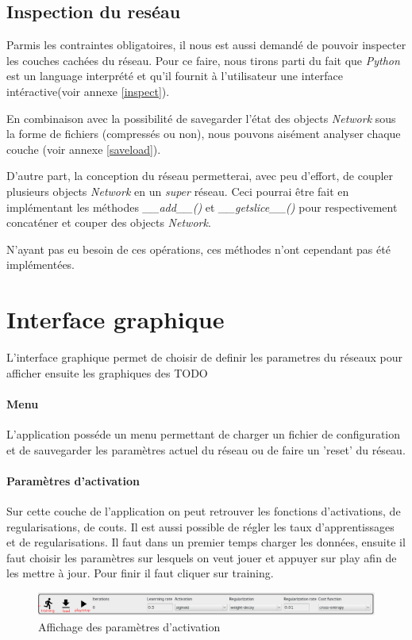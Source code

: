 \documentclass[11pt]{article}
\begin{document}
\subsection{Inspection du res\'eau}
Parmis les contraintes obligatoires, il nous est aussi demand\'e de pouvoir
inspecter les couches cach\'ees du r\'eseau. Pour ce faire, nous tirons parti du
fait que {\em Python} est un language interpr\'et\'e et qu'il fournit \`a
l'utilisateur une interface int\'eractive(voir annexe \ref{inspect}).

En combinaison avec la possibilit\'e de savegarder l'\'etat des
objects {\em Network} sous la forme de fichiers (compress\'es ou non), nous
pouvons ais\'ement analyser chaque couche (voir annexe \ref{saveload}).

D'autre part, la conception du r\'eseau permetterai, avec peu d'effort, de coupler
plusieurs objects {\em Network} en un {\em super} r\'eseau.
Ceci pourrai \^etre fait en impl\'ementant les m\'ethodes {\em \_\_add\_\_()}
et {\em \_\_getslice\_\_()} pour respectivement concat\'ener et couper des objects
{\em Network}.

N'ayant pas eu besoin de ces op\'erations, ces m\'ethodes n'ont
cependant pas \'et\'e impl\'ement\'ees.

\newpage
\section{Interface graphique}
{\color{red}
L'interface graphique permet de choisir de definir les parametres du r\'eseaux
pour afficher ensuite les graphiques des TODO}
\paragraph{Menu} L'application poss\'ede un menu permettant de charger un
fichier de configuration et de sauvegarder les param\`etres actuel du r\'eseau
ou de faire un 'reset' du r\'eseau.

\paragraph{Param\`etres d'activation} Sur cette couche de l'application on
peut retrouver les fonctions d'activations, de regularisations, de couts.
Il est aussi possible de r\'egler les taux d'apprentissages et de
regularisations. Il faut dans un premier temps charger les donn\'ees, ensuite il faut choisir
les param\`etres sur lesquels on veut jouer et appuyer sur play afin de les
mettre \`a jour. Pour finir il faut cliquer sur training.
\begin{figure}[htp]
	\centering
	\includegraphics[scale=.4]{img/parametersLayer.png}
	\caption{Affichage des param\`etres d'activation}
\end{figure}
\end{document}
